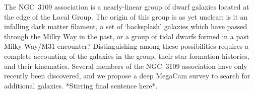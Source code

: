 The NGC~3109 association is a nearly-linear group of dwarf galaxies located at the edge of the Local Group. 
The origin of this group is as yet unclear: is it an infalling dark matter filament, a set of `backsplash' galaxies
which have passed through the Milky Way in the past, or a group of tidal dwarfs formed in a past Milky Way/M31
encounter? Distinguishing among these possibilities requires a complete accounting of the galaxies in
the group, their star formation histories, and their kinematics. Several members of the NGC~3109 association 
have only  recently been discovered, and we propose a deep MegaCam survey to search for additional galaxies.
*Stirring final sentence here*.
